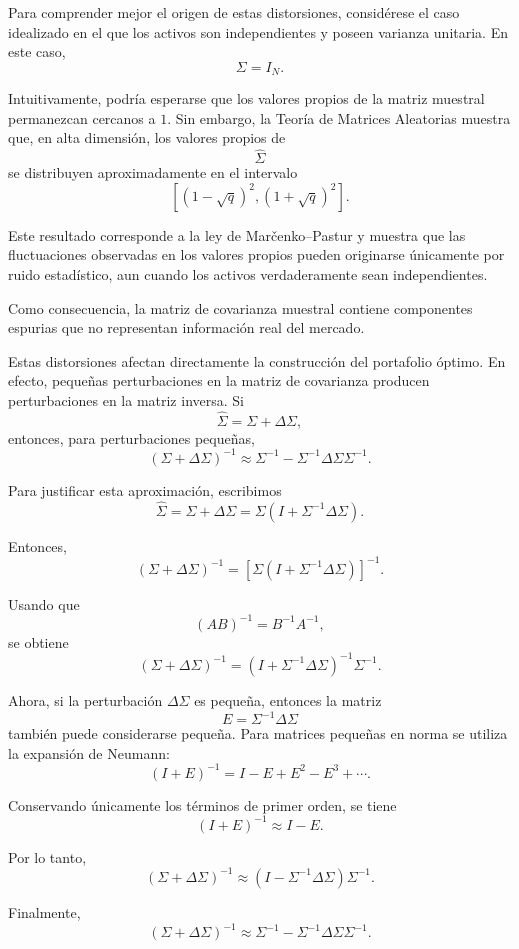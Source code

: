\documentclass[letterpaper,12pt,oneside]{book}
\begin{document}
Para comprender mejor el origen de estas distorsiones, considérese el caso idealizado en el que los activos son independientes y poseen varianza unitaria. En este caso,
\[
\Sigma=I_N.
\]

Intuitivamente, podría esperarse que los valores propios de la matriz muestral permanezcan cercanos a \(1\). Sin embargo, la Teoría de Matrices Aleatorias muestra que, en alta dimensión, los valores propios de
\[
\widehat{\Sigma}
\]
se distribuyen aproximadamente en el intervalo
\[
\left[
(1-\sqrt q)^2,
(1+\sqrt q)^2
\right].
\]

Este resultado corresponde a la ley de Marčenko--Pastur y muestra que las fluctuaciones observadas en los valores propios pueden originarse únicamente por ruido estadístico, aun cuando los activos verdaderamente sean independientes.

Como consecuencia, la matriz de covarianza muestral contiene componentes espurias que no representan información real del mercado.

Estas distorsiones afectan directamente la construcción del portafolio óptimo. En efecto, pequeñas perturbaciones en la matriz de covarianza producen perturbaciones en la matriz inversa. Si
\[
\widehat{\Sigma}
=
\Sigma+\Delta\Sigma,
\]
entonces, para perturbaciones pequeñas,
\[
(\Sigma+\Delta\Sigma)^{-1}
\approx
\Sigma^{-1}
-
\Sigma^{-1}
\Delta\Sigma
\Sigma^{-1}.
\]

Para justificar esta aproximación, escribimos
\[
\widehat{\Sigma}
=
\Sigma+\Delta\Sigma
=
\Sigma
\left(
I+\Sigma^{-1}\Delta\Sigma
\right).
\]

Entonces,
\[
(\Sigma+\Delta\Sigma)^{-1}
=
\left[
\Sigma
\left(
I+\Sigma^{-1}\Delta\Sigma
\right)
\right]^{-1}.
\]

Usando que
\[
(AB)^{-1}=B^{-1}A^{-1},
\]
se obtiene
\[
(\Sigma+\Delta\Sigma)^{-1}
=
\left(
I+\Sigma^{-1}\Delta\Sigma
\right)^{-1}
\Sigma^{-1}.
\]

Ahora, si la perturbación \(\Delta\Sigma\) es pequeña, entonces la matriz
\[
E=\Sigma^{-1}\Delta\Sigma
\]
también puede considerarse pequeña. Para matrices pequeñas en norma se utiliza la expansión de Neumann:
\[
(I+E)^{-1}
=
I-E+E^2-E^3+\cdots.
\]

Conservando únicamente los términos de primer orden, se tiene
\[
(I+E)^{-1}
\approx
I-E.
\]

Por lo tanto,
\[
(\Sigma+\Delta\Sigma)^{-1}
\approx
(I-\Sigma^{-1}\Delta\Sigma)\Sigma^{-1}.
\]

Finalmente,
\[
(\Sigma+\Delta\Sigma)^{-1}
\approx
\Sigma^{-1}
-
\Sigma^{-1}\Delta\Sigma\Sigma^{-1}.
\]
\end{document}
